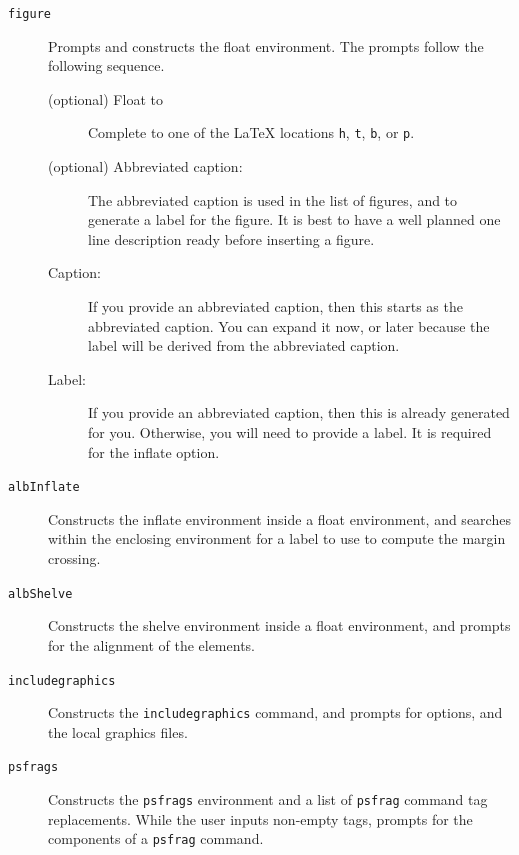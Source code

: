 \documentclass[11pt,a4paper,oneside,titlepage]{alb-corp}
\begin{document}
\begin{description}
\item[\texttt{figure}] Prompts and constructs the float environment.
  The prompts follow the following sequence.

  \begin{description}
  \item[(optional) Float to] Complete to one of the \LaTeX{} locations
    \texttt{h}, \texttt{t}, \texttt{b}, or \texttt{p}.

  \item[(optional) Abbreviated caption:] The abbreviated caption is used
    in the list of figures, and to generate a label for the figure.  It
    is best to have a well planned one line description ready before
    inserting a figure.

  \item[Caption:] If you provide an abbreviated caption, then this
    starts as the abbreviated caption.  You can expand it now, or later
    because the label will be derived from the abbreviated caption.

  \item[Label:] If you provide an abbreviated caption, then this is
    already generated for you.  Otherwise, you will need to provide a
    label.  It is required for the inflate option.
  \end{description}

\item[\texttt{albInflate}] Constructs the inflate environment inside a
  float environment, and searches within the enclosing environment for a
  label to use to compute the margin crossing.

\item[\texttt{albShelve}] Constructs the shelve environment inside a
  float environment, and prompts for the alignment of the elements.

\item[\texttt{includegraphics}] Constructs the \texttt{includegraphics}
  command, and prompts for options, and the local graphics files.

\item[\texttt{psfrags}] Constructs the \texttt{psfrags} environment and
  a list of \texttt{psfrag} command tag replacements.  While the user
  inputs non-empty tags, \AUCTeX{} prompts for the components of a
  \texttt{psfrag} command.
\end{description}



\end{document}
